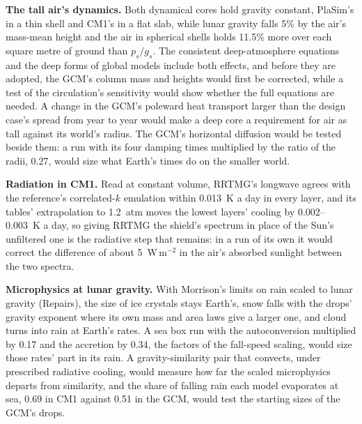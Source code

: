 \textbf{The tall air's dynamics.} Both dynamical cores hold gravity constant, PlaSim's in a thin shell and CM1's in
a flat slab, while lunar gravity falls 5\% by the air's mass-mean height and the air in spherical shells holds
11.5\% more over each square metre of ground than $p_s/g_s$. The consistent deep-atmosphere equations
\autocite{white2005consistent} and the deep forms of global models \autocite{mayne2014unified} include both
effects, and before they are adopted, the GCM's column mass and heights would first be corrected, while a test of
the circulation's sensitivity would show whether the full equations are needed. A change in the GCM's poleward heat transport larger than the
design case's spread from year to year would make a deep core a requirement for air as tall against its world's
radius. The GCM's horizontal diffusion would be tested beside them: a run with its four damping times multiplied by
the ratio of the radii, 0.27, would size what Earth's times do on the
smaller world.

\textbf{Radiation in CM1.} Read at constant volume, RRTMG's longwave agrees with the reference's correlated-$k$
emulation within 0.013~K a day in every layer, and its tables' extrapolation to 1.2~atm moves the lowest layers'
cooling by 0.002--0.003~K a day, so giving RRTMG the shield's spectrum in place of the Sun's unfiltered one is the
radiative step that remains: in a run of its own it would correct the difference of about 5~W\,m$^{-2}$ in the air's
absorbed sunlight between the two spectra.

\textbf{Microphysics at lunar gravity.} With Morrison's limits on rain scaled to lunar gravity (Repairs), the size
of ice crystals stays Earth's, snow falls with the drops' gravity exponent where its own mass and area laws give a larger
one, and cloud turns into rain at Earth's rates. A sea box run with the autoconversion
multiplied by 0.17 and the accretion by 0.34, the factors of the fall-speed scaling, would size those rates' part in
its rain. A gravity-similarity pair that convects, under prescribed radiative cooling, would measure how far
the scaled microphysics departs from similarity, and the share of falling rain each model evaporates at sea, 0.69 in
CM1 against 0.51 in the GCM, would test the starting sizes of the GCM's drops.

